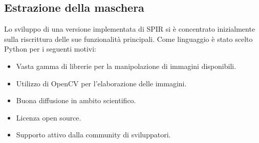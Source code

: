\documentclass[a4paper,12pt]{report}
\begin{document}
    \subsection{Estrazione della maschera}
      Lo sviluppo di una versione implementata di SPIR si è concentrato inizialmente sulla riscrittura delle sue funzionalità principali.
      Come linguaggio è stato scelto Python per i seguenti motivi:
      \begin{itemize}
        \item Vasta gamma di librerie per la manipolazione di immagini disponibili.
        \item Utilizzo di OpenCV \cite{opencv_library} per l'elaborazione delle immagini.
        \item Buona diffusione in ambito scientifico.
        \item Licenza open source.
        \item Supporto attivo dalla community di sviluppatori.

      \end{itemize}
      
\end{document}
